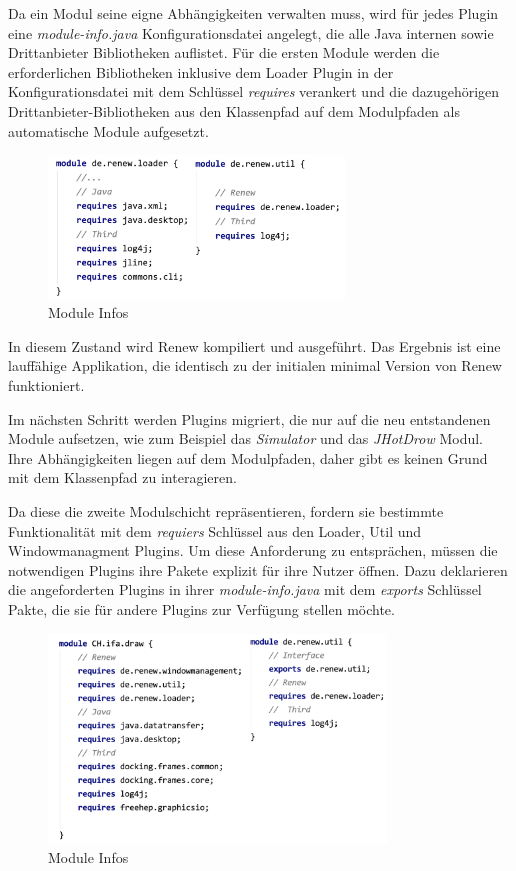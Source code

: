 	Da ein Modul seine eigne Abhängigkeiten verwalten muss, wird für jedes Plugin eine \textit{module-info.java} Konfigurationsdatei angelegt, die alle Java internen sowie Drittanbieter Bibliotheken auflistet. Für die ersten Module werden die erforderlichen Bibliotheken inklusive dem Loader Plugin in der Konfigurationsdatei mit dem Schlüssel \textit{requires} verankert und die dazugehörigen Drittanbieter-Bibliotheken aus den Klassenpfad auf dem Modulpfaden als automatische Module aufgesetzt.
	\begin{figure}[h!]
	  \centering
	  \includegraphics[width=0.7\textwidth]{material/images/loaderUtil-info.png}
	  \caption{Module Infos}
	  \label{fig:loaderUtil}
	\end{figure}

	In diesem Zustand wird Renew kompiliert und ausgeführt. Das Ergebnis ist eine lauffähige Applikation, die identisch zu der initialen minimal Version von Renew funktioniert. 
	\bigbreak

	Im nächsten Schritt werden Plugins migriert, die nur auf die neu entstandenen Module aufsetzen, wie zum Beispiel das \textit{Simulator} und das \textit{JHotDrow} Modul. Ihre Abhängigkeiten liegen auf dem Modulpfaden, daher gibt es keinen Grund mit dem Klassenpfad zu interagieren. 


	Da diese die zweite Modulschicht repräsentieren, fordern sie bestimmte Funktionalität mit dem \textit{requiers} Schlüssel aus den Loader, Util und Windowmanagment Plugins. Um diese Anforderung zu entsprächen, müssen die notwendigen Plugins ihre Pakete  explizit für ihre Nutzer öffnen. Dazu deklarieren die angeforderten Plugins in ihrer \textit{module-info.java} mit dem \textit{exports} Schlüssel Pakte, die sie für andere Plugins zur Verfügung stellen möchte. 
	\begin{figure}[h!]
	  \centering
	  \includegraphics[width=0.8\textwidth]{material/images/utilCH-info.png}
	  \caption{Module Infos}
	  \label{fig:utilCH}
	\end{figure}

